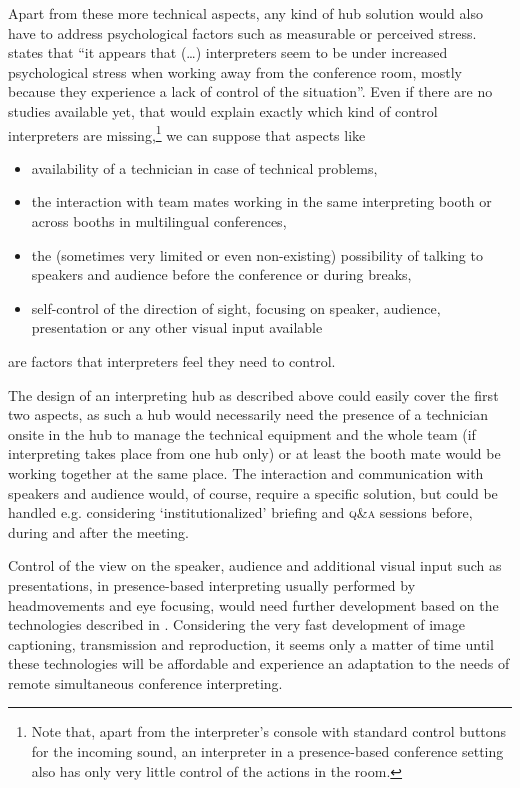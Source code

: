 \documentclass[output=paper]{langsci/langscibook}
\begin{document}
\largerpage
Apart from these more technical aspects, any kind of hub solution would also have to address psychological factors such as measurable or perceived stress. \citet[15]{Moser-Mercer2005} states that “it appears that (…) interpreters seem to be under increased psychological stress when working away from the conference room, mostly because they experience a lack of control of the situation”. Even if there are no studies available yet, that would explain exactly which kind of control interpreters are missing,\footnote{Note that, apart from the interpreter’s console with standard control buttons for the incoming sound, an interpreter in a presence-based conference setting also has only very little control of the actions in the room.} we can suppose that aspects like

\begin{itemize}
\item availability of a technician in case of technical problems,
\item the interaction with team mates working in the same interpreting booth or across booths in multilingual conferences,
\item the (sometimes very limited or even non-existing) possibility of talking to speakers and audience before the conference or during breaks,
\item self-control of the direction of sight, focusing on speaker, audience, presentation or any other visual input available
\end{itemize}

are factors that interpreters feel they need to control.

The design of an interpreting hub as described above could easily cover the first two aspects, as such a hub would necessarily need the presence of a technician onsite in the hub to manage the technical equipment and the whole team (if interpreting takes place from one hub only) or at least the booth mate would be working together at the same place. 
The interaction and communication with speakers and audience would, of course, require a specific solution, but could be handled e.g. considering ‘institutionalized’ briefing and \textsc{q\&a} sessions before, during and after the meeting.

Control of the view on the speaker, audience and additional visual input such as presentations, in presence-based interpreting usually performed by head\linebreak movements and eye focusing, would need further development based on the technologies described in . Considering the very fast development of image captioning, transmission and reproduction, it seems only a matter of time until these technologies will be affordable and experience an adaptation to the needs of remote simultaneous conference interpreting. 
\end{document}

